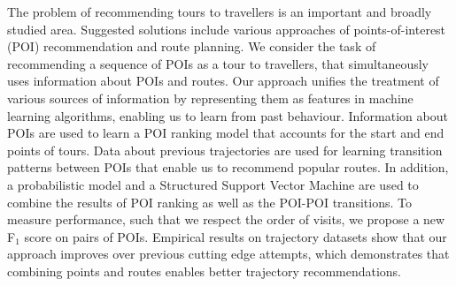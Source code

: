 The problem of recommending tours to travellers is an important and broadly studied area.
Suggested solutions include various approaches of points-of-interest (POI) 
recommendation and route planning.
We consider the task of recommending a sequence of POIs as a tour
to travellers, that simultaneously uses information about POIs and routes.
Our approach unifies the treatment of various sources of information
by representing them as features in machine learning algorithms, enabling us to
learn from past behaviour. %
Information about POIs are used to learn a POI ranking model
that accounts for the start and end points of tours.
Data about previous trajectories are used for learning transition patterns between POIs that
enable us to recommend popular routes.
In addition, a probabilistic model 
and a Structured Support Vector Machine are used
to combine the results of POI ranking as well as the POI-POI transitions.
To measure performance, such that we respect the order of visits, we propose
a new F$_1$ score on pairs of POIs.
Empirical results on trajectory datasets show that our approach improves over 
previous cutting edge attempts, which demonstrates that
combining points and routes enables better trajectory recommendations.
